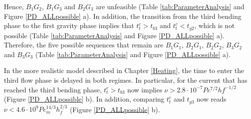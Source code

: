Hence,  $B_1G_2$,   $B_1G_3$  and   $B_2G_3$  are   unfeasible  (Table
\ref{tab:ParameterAnalysis}  and Figure  \ref{PD_ALLpossible} a).   In
addition, the  transition from  the third bending  phase to  the first
gravity phase implies that $t_t^c>t_{b3}$ and $t_t^c<t_{g2}$, which is
not   possible    (Table   \ref{tab:ParameterAnalysis}    and   Figure
\ref{PD_ALLpossible} a).  Therefore, the  five possible sequences that
remain are $B_1G_1$, $B_2G_1$,  $B_2G_2$, $B_3G_2$ and $B_3G_3$ (Table
\ref{tab:ParameterAnalysis} and Figure \ref{PD_ALLpossible} a).

In the  more realistic model  described in Chapter  \ref{Heating}, the
time to  enter the  third flow  phase is delayed  in both  regimes. In
particular, for the current that  has reached the third bending phase,
$t_t^c>t_{b3}$  now  implies  $\nu>2.8\cdot10^{-7}  Pe^{7/2}hf^{-1/2}$
(Figure \ref{PD_ALLpossible}  b).  In addition, comparing  $t_t^c$ and
$t_{g3}$  now reads  $\nu<4.6\cdot 10^9  Pe_m^{14/3}h_f^{2/3}$ (Figure
\ref{PD_ALLpossible} b).

